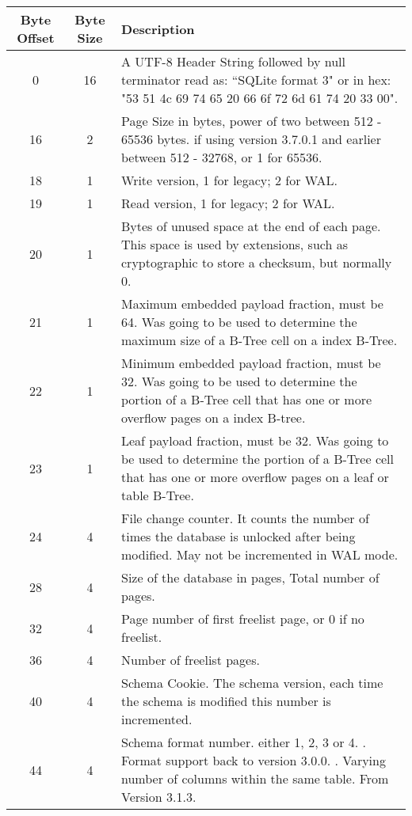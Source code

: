 \begin{longtable}[h]{| c | c | p{10cm} |}
		\hline
			\textbf{Byte Offset} & \textbf{Byte Size} & \textbf{Description} \\ 
		\hline
		\endhead
			0 & 16 & A UTF-8 Header String followed by null terminator read as: ``SQLite format 3" or in hex: "53 51 4c 69 74 65 20 66 6f 72 6d 61 74 20 33 00". \\
		\hline
			16 & 2 & Page Size 	in bytes, power of two between 512 - 65536 bytes. if using version 3.7.0.1 and earlier between 512 - 32768, or 1 for 65536. \\
		\hline
			18 & 1 & Write version, 1 for legacy; 2 for WAL. \\
		\hline
			19 & 1 & Read version, 1 for legacy; 2 for WAL. \\
		\hline
			20 & 1 & Bytes of unused space at the end of each page. This space is used by extensions, such as cryptographic to store a checksum, but normally 0. \\
		\hline
			21 & 1 & Maximum embedded payload fraction, must be 64. Was going to be used to determine the maximum size of a B-Tree cell on a index B-Tree. \\
		\hline
			22 & 1 & Minimum embedded payload fraction, must be 32. Was going to be used to determine the portion of a B-Tree cell that has one or more overflow pages on a index B-tree. \\
		\hline
			23 & 1 & Leaf payload fraction, must be 32. Was going to be used to determine the portion of a B-Tree cell that has one or more overflow pages on a leaf or table B-Tree. \\
		\hline
			24 & 4 & File change counter. It counts the number of times the database is unlocked after being modified. May not be incremented in WAL mode. \\
		\hline
			28 & 4 & Size of the database in pages, Total number of pages. \\
		\hline
			32 & 4 & Page number of first freelist page, or 0 if no freelist. \\
		\hline
			36 & 4 & Number of freelist pages. \\
		\hline
			40 & 4 & Schema Cookie. The schema version, each time the schema is modified this number is incremented. \\
		\hline
			44 & 4 & Schema format number. either 1, 2, 3 or 4. \newline
			1. Format support back to version 3.0.0. \newline
			2. Varying number of columns within the same table. From Version 3.1.3. \newline 

\end{longtable}
